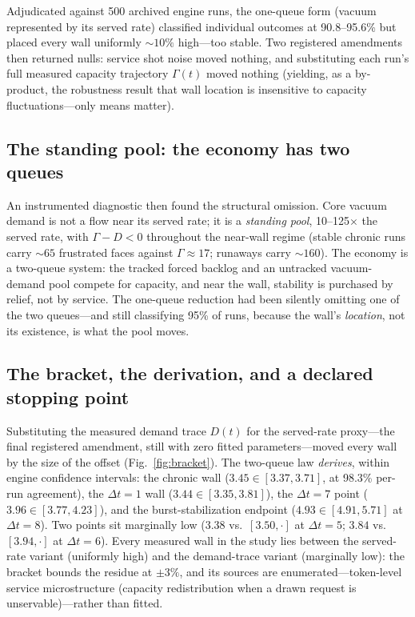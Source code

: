 \documentclass[11pt]{article}
\newcommand{\dt}{\Delta t}
\begin{document}
Adjudicated against 500 archived engine runs, the one-queue form (vacuum
represented by its served rate) classified individual outcomes at
90.8--95.6\% but placed every wall uniformly ${\sim}10\%$ high---too stable.
Two registered amendments then returned nulls: service shot noise moved
nothing, and substituting each run's full measured capacity trajectory
$\Gamma(t)$ moved nothing (yielding, as a by-product, the robustness result
that wall location is insensitive to capacity fluctuations---only means
matter).

\subsection{The standing pool: the economy has two queues}
An instrumented diagnostic then found the structural omission. Core vacuum
demand is not a flow near its served rate; it is a \emph{standing pool},
10--125$\times$ the served rate, with $\Gamma-D<0$ throughout the near-wall
regime (stable chronic runs carry ${\sim}65$ frustrated faces against
$\Gamma\approx17$; runaways carry ${\sim}160$). The economy is a two-queue
system: the tracked forced backlog and an untracked vacuum-demand pool compete
for capacity, and near the wall, stability is purchased by relief, not by
service. The one-queue reduction had been silently omitting one of the two
queues---and still classifying 95\% of runs, because the wall's
\emph{location}, not its existence, is what the pool moves.

\subsection{The bracket, the derivation, and a declared stopping point}
Substituting the measured demand trace $D(t)$ for the served-rate proxy---the
final registered amendment, still with zero fitted parameters---moved every
wall by the size of the offset (Fig.~\ref{fig:bracket}). The two-queue law
\emph{derives}, within engine confidence intervals: the chronic wall
($3.45\in[3.37,3.71]$, at 98.3\% per-run agreement), the $\dt=1$ wall
($3.44\in[3.35,3.81]$), the $\dt=7$ point ($3.96\in[3.77,4.23]$), and the
burst-stabilization endpoint ($4.93\in[4.91,5.71]$ at $\dt=8$). Two points sit
marginally low ($3.38$ vs.\ $[3.50,\cdot]$ at $\dt=5$; $3.84$ vs.\
$[3.94,\cdot]$ at $\dt=6$). Every measured wall in the study lies between the
served-rate variant (uniformly high) and the demand-trace variant (marginally
low): the bracket bounds the residue at ${\pm}3\%$, and its sources are
enumerated---token-level service microstructure (capacity redistribution when
a drawn request is unservable)---rather than fitted.
\end{document}

